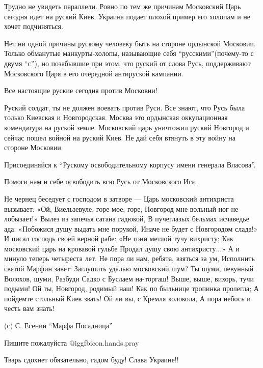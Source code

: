 \begin{itemize}
Трудно не увидеть параллели. Ровно по тем же причинам Московский Царь сегодня
идет на руский Киев. Украина подает плохой пример его холопам и не хочет
подчиняться.

Нет ни одной причины рускому человеку быть на стороне ордынской Московии.
Только обманутые манкурты-холопы, называющие себя \enquote{русскими}(почему-то с двумя
\enquote{с}), но позабывшие при этом, что руский от слова Русь, поддерживают
Московского Царя в его очередной антируской кампании.

Все настоящие руские сегодня против Московии!

Руский солдат, ты не должен воевать против Руси. Все знают, что Русь была
только Киевская и Новгородская. Москва это ордынская оккупационная комендатура
на руской земле. Московский царь уничтожил руский Новгород и сейчас пошел
войной на руский Киев. Не дай себя втянуть в эту войну на стороне Московии.

Присоединяйся к \enquote{Рускому освободительному корпусу имени генерала Власова}.

Помоги нам и себе освободить всю Русь от Московского Ига.

\raggedcolumns
\begin{multicols}{2} %
\setlength{\parindent}{0pt}

\obeycr
Не чернец беседует с господом в затворе —
\smallskip
Царь московский антихриста вызывает:
\smallskip
«Ой, Виельзевуле, горе мое, горе,
Новгород мне вольный ног не лобызает!»
Вылез из запечья сатана гадюкой,
В пучеглазых бельмах исчаведье ада:
\smallskip
«Побожися душу выдать мне порукой,
Иначе не будет с Новгородом слада!»
И писал господь своей верной рабе:
«Не гони метлой тучу вихристу;
Как московский царь на кровавой гульбе
Продал душу свою антихристу...»
А и минуло теперь четыреста лет.
\smallskip
Не пора ли нам, ребята, взяться за ум,
Исполнить святой Марфин завет:
Заглушить удалью московский шум?
Ты шуми, певунный Волохов, шуми,
Разбуди Садко с Буслаем на-торгаш!
\smallskip
Выше, выше, вихорь, тучи подыми!
Ой ты, Новгород, родимый наш!
Как по быльнице тропинка пролегла;
А пойдемте стольный Киев звать!
Ой ли вы, с Кремля колокола,
А пора небось и честь вам знать!
\restorecr
\end{multicols} %

(с) С. Есенин \enquote{Марфа Посадница}

Пишите пожалуйста  @igg{fbicon.hands.pray} 

Тварь сдохнет обязательно, гадом буду! Слава Украине!!

\end{itemize} %

